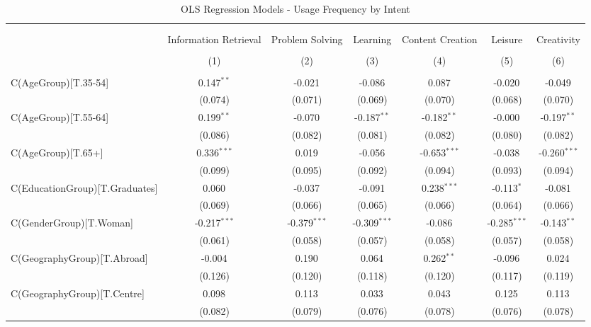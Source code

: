 \begin{table}[!htbp] \centering
  \caption{OLS Regression Models - Usage Frequency by Intent}
\begin{tabular}{@{\extracolsep{5pt}}lcccccc}
\\[-1.8ex]\hline
\hline \\[-1.8ex]
\\[-1.8ex] & \multicolumn{1}{c}{Information Retrieval} & \multicolumn{1}{c}{Problem Solving} & \multicolumn{1}{c}{Learning} & \multicolumn{1}{c}{Content Creation} & \multicolumn{1}{c}{Leisure} & \multicolumn{1}{c}{Creativity}  \\
\\[-1.8ex] & (1) & (2) & (3) & (4) & (5) & (6) \\
\hline \\[-1.8ex]
 C(AgeGroup)[T.35-54] & 0.147$^{**}$ & -0.021$^{}$ & -0.086$^{}$ & 0.087$^{}$ & -0.020$^{}$ & -0.049$^{}$ \\
& (0.074) & (0.071) & (0.069) & (0.070) & (0.068) & (0.070) \\
 C(AgeGroup)[T.55-64] & 0.199$^{**}$ & -0.070$^{}$ & -0.187$^{**}$ & -0.182$^{**}$ & -0.000$^{}$ & -0.197$^{**}$ \\
& (0.086) & (0.082) & (0.081) & (0.082) & (0.080) & (0.082) \\
 C(AgeGroup)[T.65+] & 0.336$^{***}$ & 0.019$^{}$ & -0.056$^{}$ & -0.653$^{***}$ & -0.038$^{}$ & -0.260$^{***}$ \\
& (0.099) & (0.095) & (0.092) & (0.094) & (0.093) & (0.094) \\
 C(EducationGroup)[T.Graduates] & 0.060$^{}$ & -0.037$^{}$ & -0.091$^{}$ & 0.238$^{***}$ & -0.113$^{*}$ & -0.081$^{}$ \\
& (0.069) & (0.066) & (0.065) & (0.066) & (0.064) & (0.066) \\
 C(GenderGroup)[T.Woman] & -0.217$^{***}$ & -0.379$^{***}$ & -0.309$^{***}$ & -0.086$^{}$ & -0.285$^{***}$ & -0.143$^{**}$ \\
& (0.061) & (0.058) & (0.057) & (0.058) & (0.057) & (0.058) \\
 C(GeographyGroup)[T.Abroad] & -0.004$^{}$ & 0.190$^{}$ & 0.064$^{}$ & 0.262$^{**}$ & -0.096$^{}$ & 0.024$^{}$ \\
& (0.126) & (0.120) & (0.118) & (0.120) & (0.117) & (0.119) \\
 C(GeographyGroup)[T.Centre] & 0.098$^{}$ & 0.113$^{}$ & 0.033$^{}$ & 0.043$^{}$ & 0.125$^{}$ & 0.113$^{}$ \\
& (0.082) & (0.079) & (0.076) & (0.078) & (0.076) & (0.078) \\

\end{tabular}
\end{table}
